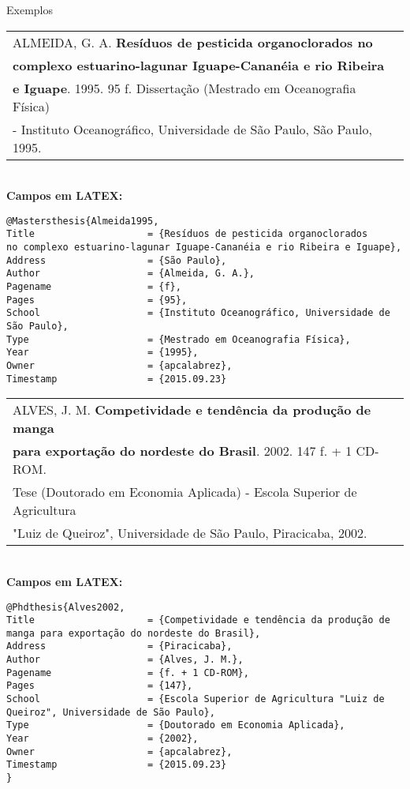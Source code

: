 Exemplos \\

\begin{tabular}{|l|c|} \hline
ALMEIDA, G. A. \textbf{Resíduos de pesticida organoclorados no} \\ \textbf{complexo estuarino-lagunar Iguape-Cananéia e rio Ribeira}\\ \textbf{e Iguape}. 1995. 95 f.
Dissertação (Mestrado em Oceanografia Física)\\ - Instituto
Oceanográfico, Universidade de São Paulo, São Paulo, 1995.   \\\hline
\end{tabular} \\

\textbf{Campos em LATEX:}

\begin{verbatim}
@Mastersthesis{Almeida1995,
Title                    = {Resíduos de pesticida organoclorados 
no complexo estuarino-lagunar Iguape-Cananéia e rio Ribeira e Iguape},
Address                  = {São Paulo},
Author                   = {Almeida, G. A.},
Pagename                 = {f},
Pages                    = {95},
School                   = {Instituto Oceanográfico, Universidade de 
São Paulo},
Type                     = {Mestrado em Oceanografia Física},
Year                     = {1995},
Owner                    = {apcalabrez},
Timestamp                = {2015.09.23}
\end{verbatim}

\begin{tabular}{|l|c|} \hline
ALVES, J. M. \textbf{Competividade e tendência da produção de manga} \\ \textbf{para exportação do nordeste do Brasil}. 2002. 147 f. + 1 CD-ROM.\\ Tese (Doutorado em Economia Aplicada) - Escola Superior de Agricultura \\ "Luiz de Queiroz", Universidade de São Paulo, Piracicaba, 2002.    \\\hline
\end{tabular} \\

\textbf{Campos em LATEX:} 

\begin{verbatim}
@Phdthesis{Alves2002,
Title                    = {Competividade e tendência da produção de 
manga para exportação do nordeste do Brasil},
Address                  = {Piracicaba},
Author                   = {Alves, J. M.},
Pagename                 = {f. + 1 CD-ROM},
Pages                    = {147},
School                   = {Escola Superior de Agricultura "Luiz de 
Queiroz", Universidade de São Paulo},
Type                     = {Doutorado em Economia Aplicada},
Year                     = {2002},
Owner                    = {apcalabrez},
Timestamp                = {2015.09.23}
}
\end{verbatim} 

